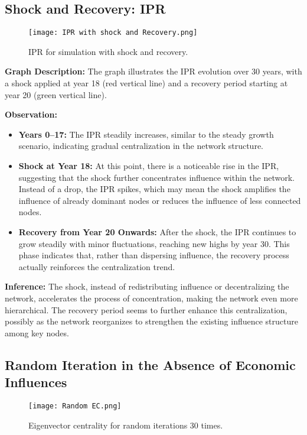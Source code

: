 \documentclass{article} %
\begin{document}
\subsection{Shock and Recovery: IPR}
\begin{figure}[h]
\begin{center}
    \texttt{[image: IPR with shock and Recovery.png]}
\end{center}
\caption{IPR for simulation with shock and recovery.}
\end{figure}
\textbf{Graph Description:} The graph illustrates the IPR evolution over 30 years, with a shock applied at year 18 (red vertical line) and a recovery period starting at year 20 (green vertical line).

\textbf{Observation:}

\begin{itemize}
    \item \textbf{Years 0--17:} The IPR steadily increases, similar to the steady growth scenario, indicating gradual centralization in the network structure.
    \item \textbf{Shock at Year 18:} At this point, there is a noticeable rise in the IPR, suggesting that the shock further concentrates influence within the network. Instead of a drop, the IPR spikes, which may mean the shock amplifies the influence of already dominant nodes or reduces the influence of less connected nodes.
    \item \textbf{Recovery from Year 20 Onwards:} After the shock, the IPR continues to grow steadily with minor fluctuations, reaching new highs by year 30. This phase indicates that, rather than dispersing influence, the recovery process actually reinforces the centralization trend.
\end{itemize}

\textbf{Inference:} The shock, instead of redistributing influence or decentralizing the network, accelerates the process of concentration, making the network even more hierarchical. The recovery period seems to further enhance this centralization, possibly as the network reorganizes to strengthen the existing influence structure among key nodes.





\subsection{Random Iteration in the Absence of Economic Influences}
\begin{figure}[h]
\begin{center}
    \texttt{[image: Random EC.png]}
\end{center}
\caption{Eigenvector centrality for random iterations 30 times.}
\end{figure}
\end{document}
